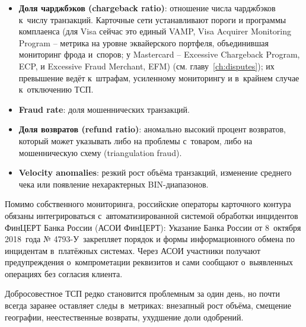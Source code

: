 \begin{itemize}
  \item \textbf{Доля чарджбэков (chargeback ratio)}: отношение числа чарджбэков
    к~числу транзакций. Карточные сети устанавливают пороги
    и программы комплаенса (для Visa сейчас это единый
      VAMP, Visa Acquirer Monitoring Program -- метрика на уровне
    эквайерского портфеля, объединившая мониторинг фрода и~споров;
    у Mastercard -- Excessive Chargeback Program, ECP,
    и Excessive Fraud Merchant, EFM)
    (см. главу~\ref{ch:disputes});
    их превышение ведёт к~штрафам, усиленному мониторингу
    и в~крайнем случае к~отключению
    ТСП.~\cite{visa-vamp-intro,mc-compliance-programs}
  \item \textbf{Fraud rate}: доля мошеннических транзакций.
  \item \textbf{Доля возвратов (refund ratio)}: аномально высокий процент
    возвратов, который может указывать либо на проблемы
    с~товаром, либо на мошенническую схему
    (triangulation fraud).
  \item \textbf{Velocity anomalies}: резкий рост объёма
    транзакций, изменение среднего чека или появление
    нехарактерных BIN-диапазонов.
\end{itemize}

Помимо собственного мониторинга, российские операторы карточного
контура обязаны интегрироваться с~автоматизированной системой
обработки инцидентов ФинЦЕРТ Банка России (АСОИ ФинЦЕРТ): Указание
Банка России от 8~октября 2018~года № 4793-У~закрепляет порядок и
формы информационного обмена по инцидентам в~платёжных системах.
Через АСОИ участники получают предупреждения о~компрометации
реквизитов и сами сообщают о~выявленных операциях без согласия
клиента.

Добросовестное ТСП редко становится проблемным за один день, но
почти всегда заранее оставляет следы в~метриках: внезапный рост
объёма, смещение географии, неестественные возвраты, ухудшение
доли одобрений.~\cite{visa-payment-facilitator-marketplace-risk-guide}

